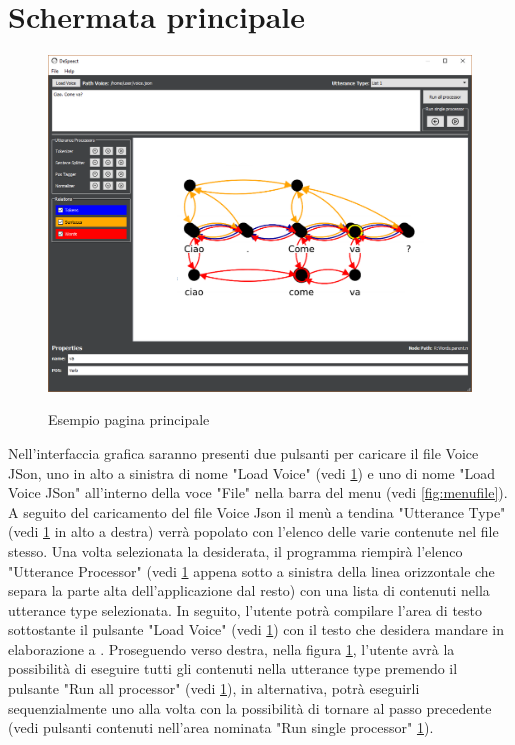 \documentclass[../AnalisideiRequisiti.tex]{subfiles}
\begin{document}
	\section{Schermata principale}
		\begin{figure}[htp]
			\caption{Esempio pagina principale}
			\centering
			\includegraphics[width=\textwidth]{../img/paginainiziale.png}
			\label{fig:GUI}
		\end{figure}	
		Nell'interfaccia grafica saranno presenti due pulsanti per caricare il file Voice JSon, uno in alto a sinistra di nome "Load Voice" (vedi \ref{fig:GUI}) e uno di nome "Load Voice JSon" all'interno della voce "File" nella barra del menu (vedi \ref{fig:menufile}).
		 A seguito del caricamento del file Voice Json il menù a tendina "Utterance Type" (vedi \ref{fig:GUI} in alto a destra) verrà popolato con l'elenco delle varie  contenute nel file stesso. 
		 Una volta selezionata la  desiderata, il programma riempirà l'elenco "Utterance Processor" (vedi \ref{fig:GUI} appena sotto a sinistra della linea orizzontale che separa la parte alta dell'applicazione dal resto) con una lista di  contenuti nella utterance type selezionata. 
		 In seguito, l'utente potrà compilare l'area di testo sottostante il pulsante "Load Voice" (vedi \ref{fig:GUI}) con il testo che desidera mandare in elaborazione a .
		 Proseguendo verso destra, nella figura \ref{fig:GUI}, l'utente avrà la possibilità di eseguire tutti gli  contenuti nella utterance type premendo il pulsante "Run all processor" (vedi \ref{fig:GUI}), in alternativa, potrà eseguirli sequenzialmente uno alla volta con la possibilità di tornare al passo precedente (vedi pulsanti contenuti nell'area nominata "Run single processor" \ref{fig:GUI}). 
\end{document}
